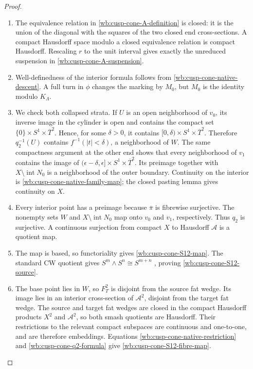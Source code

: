 \begin{proof}
\begin{enumerate}[label=\arabic*.,leftmargin=*]
\item The equivalence relation in \cref{wb:cusp-cone-A-definition} is closed: it is
the union of the diagonal with the squares of the two closed end
cross-sections.  A compact Hausdorff space modulo a closed equivalence
relation is compact Hausdorff.  Rescaling \(r\) to the unit interval gives
exactly the unreduced suspension in \cref{wb:cusp-cone-A-suspension}.

\item Well-definedness of the interior formula follows from
\cref{wb:cusp-cone-native-descent}.  A full turn in \(\phi\) changes the
marking by \(M_0\), but \(M_0\) is the identity modulo \(K_\Lambda\).

\item We check both collapsed strata.  If \(U\) is an open neighborhood of
\(v_0\), its inverse image in the cylinder is open and contains the compact
set \(\{0\}\times S^1\times\overline T^2\).  Hence, for some \(\delta>0\),
it contains
\([0,\delta)\times S^1\times\overline T^2\).  Therefore
\(q_2^{-1}(U)\) contains \(f^{-1}(|t|<\delta)\), a neighborhood of \(W\).
The same compactness argument at the other end shows that every neighborhood
of \(v_1\) contains the image of
\((\epsilon-\delta,\epsilon]\times S^1\times\overline T^2\).  Its preimage
together with \(X\setminus\operatorname{int}N_0\) is a neighborhood of the
outer boundary.  Continuity on the interior is
\cref{wb:cusp-cone-native-family-map}; the closed pasting lemma gives
continuity on \(X\).

\item Every interior point has a preimage because \(\overline\pi\) is fibrewise
surjective.  The nonempty sets \(W\) and
\(X\setminus\operatorname{int}N_0\) map onto \(v_0\) and \(v_1\),
respectively.  Thus \(q_2\) is surjective.  A continuous surjection from
compact \(X\) to Hausdorff \(\mathcal A\) is a quotient map.

\item The map is based, so functoriality gives \cref{wb:cusp-cone-S12-map}.  The
standard CW quotient gives \(S^m\wedge S^n\cong S^{m+n}\)
\cite[Chapter~0, Smash Product]{Hatcher2002}, proving
\cref{wb:cusp-cone-S12-source}.

\item The base point lies in \(W\), so \(F_T^2\) is disjoint from the source fat
wedge.  Its image lies in an interior cross-section of
\(\mathcal A^2\), disjoint from the target fat wedge.  The source and target
fat wedges are closed in the compact Hausdorff products \(X^2\) and
\(\mathcal A^2\), so both smash quotients are Hausdorff.  Their restrictions
to the relevant compact subspaces are continuous and one-to-one, and are
therefore embeddings.
Equations \cref{wb:cusp-cone-native-restriction} and \cref{wb:cusp-cone-q2-formula} give
\cref{wb:cusp-cone-S12-fibre-map}.


\end{enumerate}
\end{proof}
